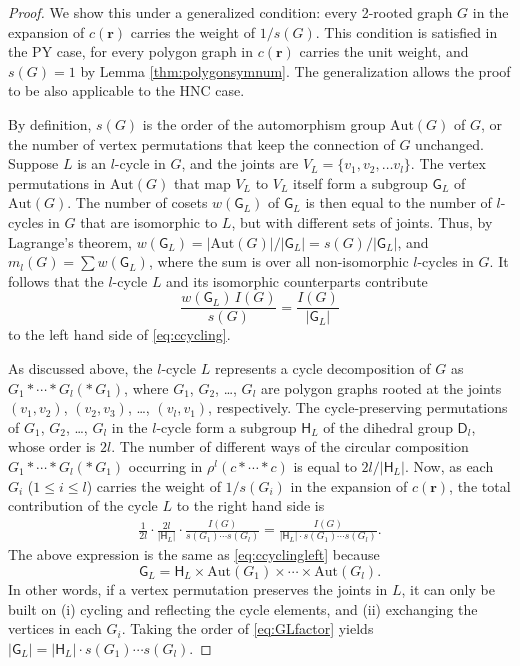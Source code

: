\documentclass[preprint]{revtex4-1}
\newcommand{\vct}[1]{\mathbf{#1}}
\providecommand{\vr}{} %
\renewcommand{\vr}{\vct{r}}
\newcommand{\G}{\mathsf{G}}
\newcommand{\D}{\mathsf{D}}
\newcommand{\Hgroup}{\mathsf{H}}
\newcommand{\Aut}{\mathrm{Aut}}
\begin{document}
\begin{proof}
We show this under a generalized condition:
every 2-rooted graph $G$ in the expansion of $c(\vr)$
carries the weight of $1/s(G)$.
%
This condition is satisfied in the PY case,
for every polygon graph in $c(\vr)$
carries the unit weight,
and $s(G) = 1$ by Lemma \ref{thm:polygonsymnum}.
%
The generalization
allows the proof to be also applicable to the HNC case. %


By definition,
$s(G)$ is the order of the automorphism group $\Aut(G)$ of $G$,
or the number of vertex permutations that keep the connection of $G$ unchanged.
%
Suppose $L$ is an $l$-cycle in $G$,
and the joints are $V_L = \{v_1, v_2, \dots v_l\}$.
%
The vertex permutations in $\Aut(G)$ that
map $V_L$ to $V_L$ itself %
form a subgroup $\G_L$ of $\Aut(G)$.
%
The number of cosets $w(\G_L)$ of $\G_L$
is then equal to the number of $l$-cycles in $G$
that are isomorphic to $L$,
but with different sets of joints.
%
Thus, by Lagrange's theorem,
$w(\G_L) = |\Aut(G)|/|\G_L| = s(G)/|\G_L|$,
%
and
$m_l(G) = \sum w(\G_L)$,
where the sum is over all non-isomorphic $l$-cycles in $G$.
%
It follows that the $l$-cycle $L$
and its isomorphic counterparts
contribute
\begin{equation}
  \frac{ w(\G_L) \, I(G) }{ s(G) }
= \frac{ I(G) }{ |\G_L|}
\label{eq:ccyclingleft}
\end{equation}
to the left hand side of \eqref{eq:ccycling}.


As discussed above,
the $l$-cycle $L$ represents a cycle decomposition of $G$
as $G_1 * \cdots * G_l (* \, G_1)$,
where $G_1$, $G_2$, \dots, $G_l$ are polygon graphs
rooted at the joints
$(v_1, v_2)$, $(v_2, v_3)$, \dots, $(v_l, v_1)$, respectively.
%
The cycle-preserving permutations of $G_1$, $G_2$, \dots, $G_l$ in the $l$-cycle
form a subgroup $\Hgroup_L$ of the dihedral group $\D_l$,
whose order is $2l$.
%
The number of different ways of the circular composition
$G_1 * \cdots * G_l (*\, G_1)$
occurring in $\rho^l (c * \cdots * c)$ is equal to $2l / |\Hgroup_L|$.
%
Now, as each $G_i$ ($1 \le i \le l$)
carries the weight of $1/s(G_i)$ in the expansion of $c(\vr)$,
the total contribution of the cycle $L$
to the right hand side is
\begin{align*}
  \frac{1}{2l}
  \cdot
  \frac{2l}{|\Hgroup_L|}
  \cdot
  \frac{I(G)}{ s(G_1) \cdots s(G_l)}
= \frac{ I(G) }
 { |\Hgroup_L| \cdot s(G_1) \cdots s(G_l) }.
\end{align*}
The above expression is the same as \eqref{eq:ccyclingleft}
because
\begin{equation}
  \G_L = \Hgroup_L \times \Aut(G_1) \times \cdots \times \Aut(G_l).
  \label{eq:GLfactor}
\end{equation}
%
In other words,
if a vertex permutation preserves the joints in $L$,
it can only be built on
(i) cycling and reflecting the cycle elements, and
(ii) exchanging the vertices in each $G_i$.
Taking the order of \eqref{eq:GLfactor} yields
$|\G_L| = |\Hgroup_L| \cdot s(G_1) \cdots s(G_l)$.
\end{proof}
\end{document}
